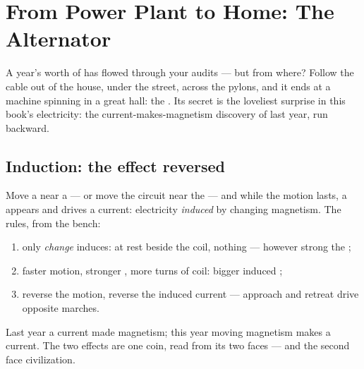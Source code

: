 \chapter{From Power Plant to Home: The Alternator}\label{ch:g9:alternator}

A year's worth of  has flowed through your
audits --- but from where? Follow the cable out of the house,
under the street, across the pylons, and it ends at a machine
spinning in a great hall: the . Its secret is the
loveliest surprise in this book's electricity: the
current-makes-magnetism discovery of last year, run backward.

\section{Induction: the effect reversed}

\begin{proposition}\label{prop:g9:alternator:induction}
Move a  near a  --- or move the circuit
near the  --- and while the motion lasts, a 
appears and drives a current: electricity \emph{induced} by
changing magnetism. The rules, from the bench:
\begin{enumerate}
  \item only \emph{change} induces:  at rest beside the
        coil, nothing --- however strong the ;
  \item faster motion, stronger , more turns of coil:
        bigger induced ;
  \item reverse the motion, reverse the induced current ---
        approach and retreat drive opposite marches.
\end{enumerate}
Last year a current made magnetism; this year moving
magnetism makes a current. The two effects are one coin,
read from its two faces --- and the second face 
civilization.
\end{proposition}

